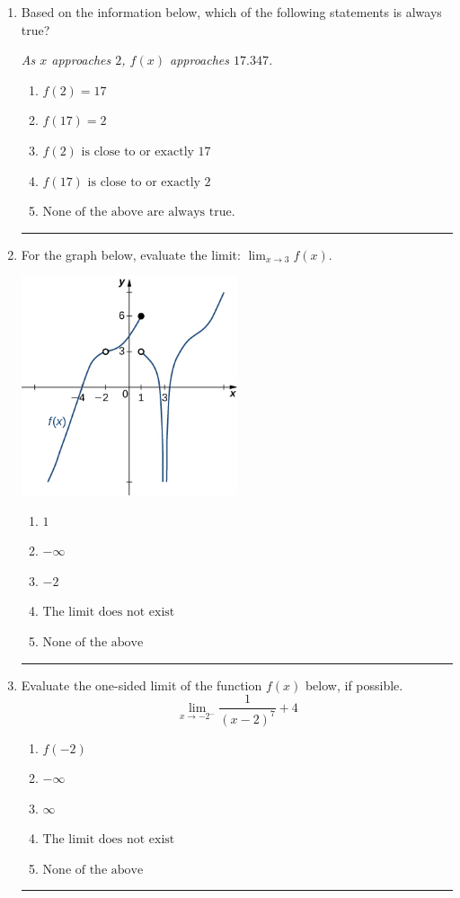 \documentclass[14pt]{extbook}
\newcommand{\litem}[1]{\item#1\hspace*{-1cm}\rule{\textwidth}{0.4pt}}
\begin{document}
\begin{enumerate}
{\begin{enumerate}[label=\Alph*.]
\end{enumerate} }
\litem{
Based on the information below, which of the following statements is always true?
\begin{center}
    \textit{ As $x$ approaches $2$, $f(x)$ approaches $17.347$. }
\end{center}
\begin{enumerate}[label=\Alph*.]
\item \( f(2) = 17 \)
\item \( f(17) = 2 \)
\item \( f(2) \text{ is close to or exactly } 17 \)
\item \( f(17) \text{ is close to or exactly } 2 \)
\item \( \text{None of the above are always true.} \)

\end{enumerate} }
\litem{
For the graph below, evaluate the limit: $ \displaystyle \lim_{x \rightarrow 3} f(x)$.
\begin{center}
    \includegraphics[width=0.5\textwidth]{../Figures/evaluateLimitGraphicallyCopyB.png}
\end{center}
\begin{enumerate}[label=\Alph*.]
\item \( 1 \)
\item \( -\infty \)
\item \( -2 \)
\item \( \text{The limit does not exist} \)
\item \( \text{None of the above} \)

\end{enumerate} }
\litem{
Evaluate the one-sided limit of the function $f(x)$ below, if possible.\[ \lim_{x \rightarrow -2^-} \frac{1}{(x-2)^7}+4 \]\begin{enumerate}[label=\Alph*.]
\item \( f(-2) \)
\item \( -\infty \)
\item \( \infty \)
\item \( \text{The limit does not exist} \)
\item \( \text{None of the above} \)


\end{enumerate}}
\end{enumerate}
\end{document}
